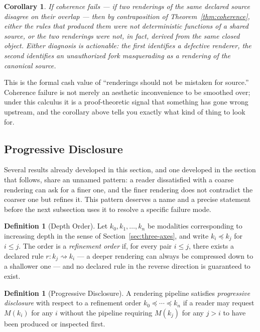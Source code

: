 \documentclass[11pt]{article}
\newtheorem{corollary}[theorem]{Corollary}
\theoremstyle{definition}
\newtheorem{definition}[theorem]{Definition}
\begin{document}
\begin{corollary}
\label{cor:coherence-failure}
If coherence fails --- if two renderings of the same declared source disagree on their overlap --- then by contraposition of Theorem~\ref{thm:coherence}, either the rules that produced them were not deterministic functions of a shared source, or the two renderings were not, in fact, derived from the same closed object. Either diagnosis is actionable: the first identifies a defective renderer, the second identifies an unauthorized fork masquerading as a rendering of the canonical source.
\end{corollary}

This is the formal cash value of ``renderings should not be mistaken for source.'' Coherence failure is not merely an aesthetic inconvenience to be smoothed over; under this calculus it is a proof-theoretic signal that something has gone wrong upstream, and the corollary above tells you exactly what kind of thing to look for.

\subsection{Progressive Disclosure}
\label{sec:progressive-disclosure}

Several results already developed in this section, and one developed in the section that follows, share an unnamed pattern: a reader dissatisfied with a coarse rendering can ask for a finer one, and the finer rendering does not contradict the coarser one but refines it. This pattern deserves a name and a precise statement before the next subsection uses it to resolve a specific failure mode.

\begin{definition}[Depth Order]
\label{def:depth-order}
Let $k_0, k_1, \dots, k_n$ be modalities corresponding to increasing depth in the sense of Section~\ref{sec:three-axes}, and write $k_i \preceq k_j$ for $i \leq j$. The order is a \emph{refinement order} if, for every pair $i \leq j$, there exists a declared rule $r : k_j \rightsquigarrow k_i$ --- a deeper rendering can always be compressed down to a shallower one --- and no declared rule in the reverse direction is guaranteed to exist.
\end{definition}

\begin{definition}[Progressive Disclosure]
\label{def:progressive-disclosure}
A rendering pipeline satisfies \emph{progressive disclosure} with respect to a refinement order $k_0 \preceq \cdots \preceq k_n$ if a reader may request $M(k_i)$ for any $i$ without the pipeline requiring $M(k_j)$ for any $j > i$ to have been produced or inspected first.
\end{definition}
\end{document}

